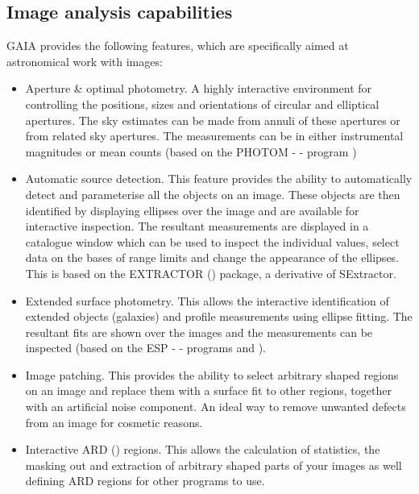 \documentclass[twoside,11pt,nolof]{starlink}
\begin{document}
\subsection{Image analysis capabilities}
GAIA provides the following features, which are specifically aimed at
astronomical work with images:
\begin{itemize}
\item Aperture \& optimal photometry. A highly interactive environment
  for controlling the positions, sizes and orientations of circular
  and elliptical apertures. The sky estimates can be made from
  annuli of these apertures or from related sky apertures. The
  measurements can be in either instrumental magnitudes or
  mean counts (based on the PHOTOM -  -
  program )

\item Automatic source detection. This feature provides the ability to
  automatically detect and parameterise all the objects on an
  image. These objects are then identified by displaying ellipses over
  the image and are available for interactive inspection. The resultant
  measurements are displayed in a catalogue window which can be used to
  inspect the individual values, select data on the bases of range
  limits and change the appearance of the ellipses. This is based on the
  EXTRACTOR () package, a derivative of
  SExtractor.

\item Extended surface photometry. This allows the interactive
  identification of extended objects (galaxies) and profile
  measurements using ellipse fitting. The resultant fits are shown
  over the images and the measurements can be inspected (based on the
  ESP -  - programs
   and ).

\item Image patching. This provides the ability to select arbitrary
  shaped regions on an image and replace them with a surface fit
  to other regions, together with an artificial noise component.
  An ideal way to remove unwanted defects from an image for
  cosmetic reasons.

\item Interactive ARD () regions. This
  allows the calculation of statistics, the masking out and
  extraction of arbitrary shaped parts of your images as well
  defining ARD regions for other programs to use.


\end{itemize}
\end{document}
